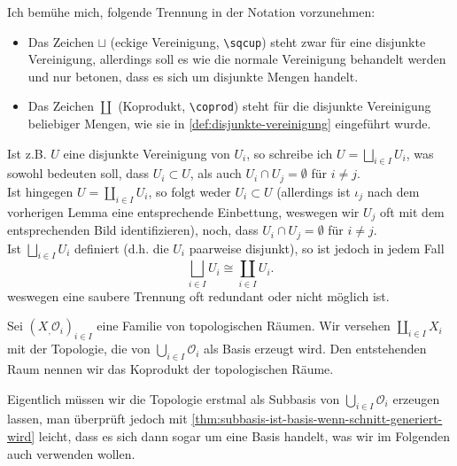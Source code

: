 \begin{notation*}
    Ich bemühe mich, folgende Trennung in der Notation vorzunehmen:
    \begin{itemize}
        \item Das Zeichen $\sqcup$ (eckige Vereinigung, \verb?\sqcup?) steht zwar für eine disjunkte Vereinigung, allerdings soll es wie die normale Vereinigung behandelt werden und nur betonen, dass es sich um disjunkte Mengen handelt.
        \item Das Zeichen  $\coprod$ (Koprodukt, \verb?\coprod?) steht für die disjunkte Vereinigung beliebiger Mengen, wie sie in \autoref{def:disjunkte-vereinigung} eingeführt wurde.
    \end{itemize}
    Ist z.B. $U$ eine disjunkte Vereinigung von  $U_i$, so schreibe ich  $U = \bigsqcup_{i \in I} U_i$, was sowohl bedeuten soll, dass  $U_i \subset U$, als auch $U_i \cap  U_j = \emptyset$ für $i\neq j$. \\
    Ist hingegen $U = \coprod_{i \in I} U_i$, so folgt weder $U_i \subset U$ (allerdings ist $ι_j$ nach dem vorherigen Lemma eine entsprechende Einbettung, weswegen wir  $U_j$ oft mit dem entsprechenden Bild identifizieren), noch, dass  $U_i \cap  U_j = \emptyset$ für $i\neq j$. \\
    Ist $\bigsqcup_{i \in I}U_i$ definiert (d.h. die $U_i$ paarweise disjunkt), so ist jedoch in jedem Fall
    \[
    \bigsqcup_{i \in I} U_i \cong \coprod_{i \in I}U_i
    .\] 
    weswegen eine saubere Trennung oft redundant oder nicht möglich ist.
\end{notation*}

\begin{definition}\label{disjunkte-vereinigung-topologischer-räume}
    Sei $(X_,\mathcal{O}_i)_{i \in I}$ eine Familie von topologischen Räumen. Wir versehen $\coprod_{i \in I}X_i$ mit der Topologie, die von $\bigcup_{i \in I}\mathcal{O}_i$ als Basis erzeugt wird. Den entstehenden Raum nennen wir das Koprodukt der topologischen Räume.
\end{definition}
\begin{remark*}
    Eigentlich müssen wir die Topologie erstmal als Subbasis von $\bigcup_{i \in  I} \mathcal{O}_i$ erzeugen lassen, man überprüft jedoch mit \autoref{thm:subbasis-ist-basis-wenn-schnitt-generiert-wird} leicht, dass es sich dann sogar um eine Basis handelt, was wir im Folgenden auch verwenden wollen.
\end{remark*}

